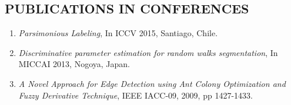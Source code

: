 \documentclass{res}
\begin{document}
\begin{resume}
        \section{PUBLICATIONS IN CONFERENCES }
        \begin{enumerate}
        \item \emph{Parsimonious Labeling}, {In ICCV 2015, Santiago, Chile}.
        \item \emph{Discriminative parameter estimation for random walks segmentation}, { In MICCAI 2013, Nogoya, Japan}.
        \item \emph{A Novel Approach for Edge Detection using Ant Colony Optimization and Fuzzy Derivative Technique}, { IEEE IACC-09}, 2009, pp 1427-1433.           

        \end{enumerate}

     
        \end{resume}
        
\end{document}
